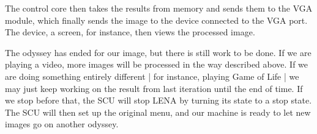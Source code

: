 The control core then takes the results from memory and sends them to the
\ac{VGA} module, which finally sends the image to the device connected to the
\ac{VGA} port. The device, a screen, for instance, then views the processed
image.

The odyssey has ended for our image, but there is still work to be done. If
we are playing a video, more images will be processed in the way described
above. If we are doing something entirely different | for instance, playing Game
of Life | we may just keep working on the result from last iteration until the
end of time. If we stop before that, the \ac{SCU} will stop \ac{LENA} by turning
its state to a stop state. The \ac{SCU} will then set up the original menu, and
our machine is ready to let new images go on another odyssey.
